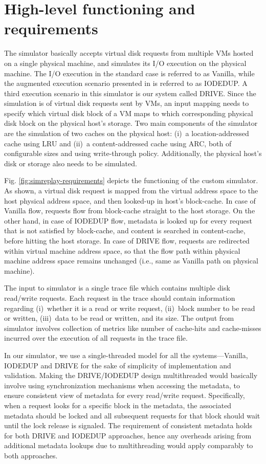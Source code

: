 \section{High-level functioning and requirements}
The simulator basically accepts virtual disk requests from multiple VMs
hosted on a single physical machine, and simulates its I/O execution
on the physical machine. The I/O execution in the standard case is referred 
to as Vanilla, while the augmented execution scenario presented
in \cite{iodedup} is referred to as IODEDUP. A third execution 
scenario in this simulator is our system called DRIVE.
Since the simulation is of virtual disk requests sent by VMs, an input 
mapping needs to specify which virtual disk block of a VM maps to which
corresponding physical disk block on the physical host's storage.
Two main components of the simulator are the simulation of two 
caches on the physical host: 
(i)~a location-addressed cache using LRU and 
(ii)~a content-addressed cache using ARC, both
of configurable sizes and using write-through policy. 
Additionally, the physical host's disk or storage also needs to be simulated. 

Fig. \ref{fig:simreplay-requirements} depicts the functioning 
of the custom simulator.
As shown, a virtual disk request is mapped from the virtual address space to
the host physical address space, and then looked-up in host's block-cache.
In case of Vanilla flow, requests flow from block-cache straight
to the host storage. On the other hand, in case of IODEDUP flow, 
metadata is looked up for every request that is not satisfied by 
block-cache, and content is searched in content-cache, before hitting
the host storage. In case of DRIVE flow, requests are redirected
within virtual machine address space, so that the flow path
within physical machine address space remains unchanged (i.e., same
as Vanilla path on physical machine).

The input to simulator is a single trace file which contains multiple
disk read/write requests. 
Each request in the trace should contain information regarding
(i)~whether it is a read or write request,
(ii)~block number to be read or written,
(iii)~data to be read or written, and its size.
The output from simulator involves collection of metrics like
number of cache-hits and cache-misses incurred over the execution of
all requests in the trace file.

In our simulator, we use a single-threaded model for all the
systems---Vanilla, IODEDUP and DRIVE for the sake of simplicity of
implementation and validation. Making the DRIVE/IODEDUP design
multithreaded would basically involve using synchronization mechanisms
when accessing the metadata, to ensure consistent view of metadata
for every read/write request. Specifically, when a request looks for
a specific block in the metadata, the associated metadata should be
locked and all subsequent requests for that block should wait until
the lock release is signaled. The requirement of consistent metadata
holds for both DRIVE and IODEDUP approaches, hence any overheads
arising from additional metadata lookups due to multithreading
would apply comparably to both approaches.

